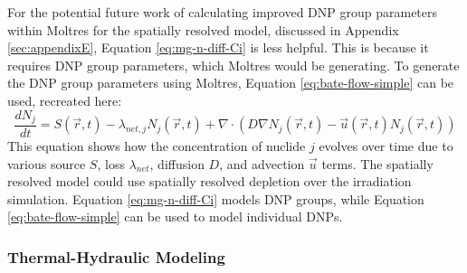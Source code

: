 For the potential future work of calculating improved \gls{DNP} group parameters within Moltres for the spatially resolved model, discussed in Appendix \ref{sec:appendixE}, Equation \eqref{eq:mg-n-diff-Ci} is less helpful.
This is because it requires \gls{DNP} group parameters, which Moltres would be generating.
To generate the \gls{DNP} group parameters using Moltres, Equation \eqref{eq:bate-flow-simple} can be used, recreated here:
\begin{equation}
    \frac{dN_j}{dt} = S(\vec{r}, t) - \lambda_{net, j} N_j(\vec{r}, t) + \nabla \cdot \left( D \nabla N_{j} (\vec{r}, t) - \vec{u}(\vec{r}, t) N_{j} (\vec{r}, t) \right)
    \nonumber
\end{equation}
This equation shows how the concentration of nuclide $j$ evolves over time due to various source $S$, loss $\lambda_{net}$, diffusion $D$, and advection $\vec{u}$ terms.
The spatially resolved model could use spatially resolved depletion over the irradiation simulation.
Equation \eqref{eq:mg-n-diff-Ci} models \gls{DNP} groups, while Equation \eqref{eq:bate-flow-simple} can be used to model individual \glspl{DNP}.

\subsubsection{Thermal-Hydraulic Modeling}

